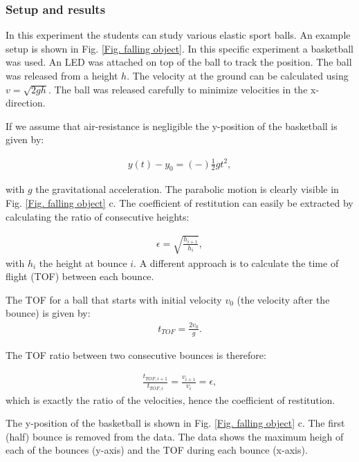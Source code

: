 \documentclass{article}
\begin{document}
\subsubsection{Setup and results}
In this experiment the students can study various elastic sport balls. An example setup is shown in Fig. \ref{Fig. falling object}. In this specific experiment a basketball was used. An LED was attached on top of the ball to track the position. The ball was released from a height $h$. The velocity at the ground can be calculated using $v = \sqrt{2gh}$. The ball was released carefully to minimize velocities in the x-direction.

If we assume that air-resistance is negligible the y-position of the basketball is given by:

\begin{align}
    y(t)-y_0 = (-)\frac{1}{2}gt^2,
\end{align}

with $g$ the gravitational acceleration. The parabolic motion is clearly visible in Fig. \ref{Fig. falling object} c. The coefficient of restitution can easily be extracted by calculating the ratio of consecutive heights:

\begin{align}
    \epsilon = \sqrt{\frac{h_{i+1}}{h_{i}}},
\end{align}
with $h_i$ the height at bounce $i$. A different approach is to calculate the time of flight (TOF) between each bounce. 

The TOF for a ball that starts with initial velocity $v_0$ (the velocity after the bounce) is given by:
\begin{align}
    t_{TOF} = \frac{2v_0}{g}.
\end{align}

The TOF ratio between two consecutive bounces is therefore:

\begin{align}
    \frac{t_{TOF,i+1}}{t_{TOF,i}} = \frac{v_{i+1}}{v_i} = \epsilon,
\end{align}
which is exactly the ratio of the velocities, hence the coefficient of restitution.

The y-position of the basketball is shown in Fig. \ref{Fig. falling object} c. The first (half) bounce is removed from the data. The data shows the maximum heigh of each of the bounces (y-axis) and the TOF during each bounce (x-axis).
\end{document}
